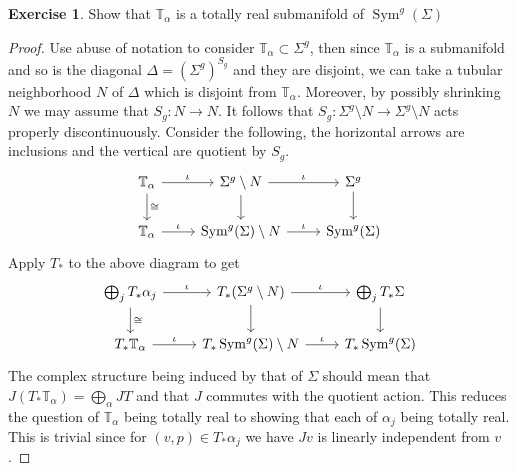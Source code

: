 \documentclass[10.5pt]{article}
\theoremstyle{definition}
\newtheorem{pb}{Exercise}
\numberwithin{proposition}{subsection}
\numberwithin{pb}{subsection}
\begin{document}
    \begin{pb}
        Show that \(\mathbb{T}_\alpha\) is a totally real submanifold of \(\operatorname{Sym}^g(\Sigma)\)

        \begin{proof}
            Use abuse of notation to consider \(\mathbb{T}_\alpha \subset \Sigma^g\), then since \(\mathbb{T}_\alpha\) is a submanifold and so is the diagonal \(\Delta = (\Sigma^g)^{S_g}\) and they are disjoint, we can take a tubular neighborhood \(N\) of \(\Delta\) which is disjoint from \(\mathbb{T}_\alpha\). Moreover, by possibly shrinking \(N\) we may assume that \(S_g: N \to N\). It follows that \(S_g: \Sigma^g \setminus N \to \Sigma^g \setminus N\) acts properly discontinuously. Consider the following, the horizontal arrows are inclusions and the vertical are quotient by \(S_g\).
            \begin{equation}\begin{tikzcd}
                \mathbb{T}_\alpha \arrow[d ,"\cong"]\arrow[r,"\iota"] &\Sigma^g \setminus N \arrow[d] \arrow[r,"\iota"] &\Sigma^g \arrow[d] \\
                \mathbb{T}_\alpha \arrow[r, "\iota"] &\operatorname{Sym}^g(\Sigma) \setminus N \arrow[r, "\iota"] &\operatorname{Sym}^g(\Sigma)
            \end{tikzcd}\end{equation}
            Apply \(T_*\) to the above diagram to get
            \begin{equation}\begin{tikzcd}
                \bigoplus_j T_* \alpha_j \arrow[d, "\cong"]\arrow[r,"\iota"] &T_*(\Sigma^g \setminus N) \arrow[d] \arrow[r,"\iota"] &\bigoplus_j T_*\Sigma \arrow[d, ""] \\
                T_*\mathbb{T}_\alpha \arrow[r, "\iota"] &T_*\operatorname{Sym}^g(\Sigma) \setminus N \arrow[r, "\iota"] &T_*\operatorname{Sym}^g(\Sigma)
            \end{tikzcd}\end{equation}
            The complex structure being induced by that of \(\Sigma\) should mean that \(J(T_*\mathbb{T}_\alpha) = \bigoplus_\alpha JT\) and that \(J\) commutes with the quotient action. This reduces the question of \(\mathbb{T}_\alpha\) being totally real to showing that each of \(\alpha_j\) being totally real. This is trivial since for \((v,p) \in T_* \alpha_j\) we have \(Jv\) is linearly independent from \(v\).
        \end{proof}
    \end{pb}
\end{document}
